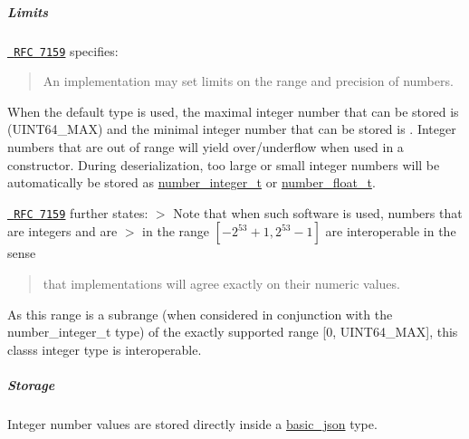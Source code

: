 \subparagraph*{Limits}

\href{http://rfc7159.net/rfc7159}{\texttt{ R\+FC 7159}} specifies\+: \begin{quote}
An implementation may set limits on the range and precision of numbers. \end{quote}


When the default type is used, the maximal integer number that can be stored is {} (U\+I\+N\+T64\+\_\+\+M\+AX) and the minimal integer number that can be stored is {}. Integer numbers that are out of range will yield over/underflow when used in a constructor. During deserialization, too large or small integer numbers will be automatically be stored as \mbox{\hyperlink{classnlohmann_1_1basic__json_a98e611d67b7bd75307de99c9358ab2dc}{number\+\_\+integer\+\_\+t}} or \mbox{\hyperlink{classnlohmann_1_1basic__json_a88d6103cb3620410b35200ee8e313d97}{number\+\_\+float\+\_\+t}}.

\href{http://rfc7159.net/rfc7159}{\texttt{ R\+FC 7159}} further states\+: $>$ Note that when such software is used, numbers that are integers and are $>$ in the range $[-2^{53}+1, 2^{53}-1]$ are interoperable in the sense \begin{quote}
that implementations will agree exactly on their numeric values. \end{quote}


As this range is a subrange (when considered in conjunction with the number\+\_\+integer\+\_\+t type) of the exactly supported range \mbox{[}0, U\+I\+N\+T64\+\_\+\+M\+AX\mbox{]}, this class\textquotesingle{}s integer type is interoperable.

\subparagraph*{Storage}

Integer number values are stored directly inside a \mbox{\hyperlink{classnlohmann_1_1basic__json}{basic\+\_\+json}} type.


